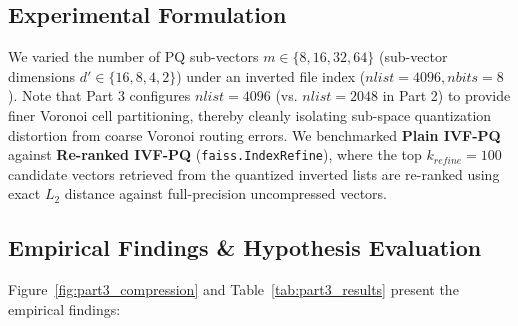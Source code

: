 \documentclass[10pt,twocolumn,a4paper]{article}
\begin{document}
\subsection{Experimental Formulation}
We varied the number of PQ sub-vectors $m \in \{8, 16, 32, 64\}$ (sub-vector dimensions $d' \in \{16, 8, 4, 2\}$) under an inverted file index ($nlist=4096, nbits=8$). Note that Part 3 configures $nlist=4096$ (vs. $nlist=2048$ in Part 2) to provide finer Voronoi cell partitioning, thereby cleanly isolating sub-space quantization distortion from coarse Voronoi routing errors. We benchmarked \textbf{Plain IVF-PQ} against \textbf{Re-ranked IVF-PQ} (\texttt{faiss.IndexRefine}), where the top $k_{refine} = 100$ candidate vectors retrieved from the quantized inverted lists are re-ranked using exact $L_2$ distance against full-precision uncompressed vectors.

\subsection{Empirical Findings \& Hypothesis Evaluation}
Figure~\ref{fig:part3_compression} and Table~\ref{tab:part3_results} present the empirical findings:

\begin{table}[t]
\centering
\small
\caption{Compression \& Exact Re-ranking on SIFT-128 (Part 3)}
\label{tab:part3_results}
\end{table}
\end{document}
